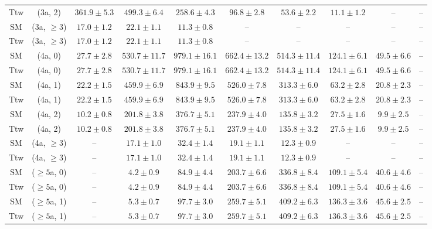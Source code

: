 \begin{table}[h!]
{\begin{tabular}{cccccccccc}
	Ttw & (3a, 2) & $361.9\pm 5.3$ & $499.3\pm 6.4$ & $258.6\pm 4.3$ & $96.8\pm 2.8$ & $53.6\pm 2.2$ & $11.1\pm 1.2$ & -- & -- \\[0.5ex] 
	SM & (3a, $\ge3$) & $17.0\pm 1.2$ & $22.1\pm 1.1$ & $11.3\pm 0.8$ & -- & -- & -- & -- & -- \\[0.5ex] 
	Ttw & (3a, $\ge3$) & $17.0\pm 1.2$ & $22.1\pm 1.1$ & $11.3\pm 0.8$ & -- & -- & -- & -- & -- \\[0.5ex] 
	SM & (4a, 0) & $27.7\pm 2.8$ & $530.7\pm 11.7$ & $979.1\pm 16.1$ & $662.4\pm 13.2$ & $514.3\pm 11.4$ & $124.1\pm 6.1$ & $49.5\pm 6.6$ & -- \\[0.5ex] 
	Ttw & (4a, 0) & $27.7\pm 2.8$ & $530.7\pm 11.7$ & $979.1\pm 16.1$ & $662.4\pm 13.2$ & $514.3\pm 11.4$ & $124.1\pm 6.1$ & $49.5\pm 6.6$ & -- \\[0.5ex] 
	SM & (4a, 1) & $22.2\pm 1.5$ & $459.9\pm 6.9$ & $843.9\pm 9.5$ & $526.0\pm 7.8$ & $313.3\pm 6.0$ & $63.2\pm 2.8$ & $20.8\pm 2.3$ & -- \\[0.5ex] 
	Ttw & (4a, 1) & $22.2\pm 1.5$ & $459.9\pm 6.9$ & $843.9\pm 9.5$ & $526.0\pm 7.8$ & $313.3\pm 6.0$ & $63.2\pm 2.8$ & $20.8\pm 2.3$ & -- \\[0.5ex] 
	SM & (4a, 2) & $10.2\pm 0.8$ & $201.8\pm 3.8$ & $376.7\pm 5.1$ & $237.9\pm 4.0$ & $135.8\pm 3.2$ & $27.5\pm 1.6$ & $9.9\pm 2.5$ & -- \\[0.5ex] 
	Ttw & (4a, 2) & $10.2\pm 0.8$ & $201.8\pm 3.8$ & $376.7\pm 5.1$ & $237.9\pm 4.0$ & $135.8\pm 3.2$ & $27.5\pm 1.6$ & $9.9\pm 2.5$ & -- \\[0.5ex] 
	SM & (4a, $\ge3$) & -- & $17.1\pm 1.0$ & $32.4\pm 1.4$ & $19.1\pm 1.1$ & $12.3\pm 0.9$ & -- & -- & -- \\[0.5ex] 
	Ttw & (4a, $\ge3$) & -- & $17.1\pm 1.0$ & $32.4\pm 1.4$ & $19.1\pm 1.1$ & $12.3\pm 0.9$ & -- & -- & -- \\[0.5ex] 
	SM & ($\ge5$a, 0) & -- & $4.2\pm 0.9$ & $84.9\pm 4.4$ & $203.7\pm 6.6$ & $336.8\pm 8.4$ & $109.1\pm 5.4$ & $40.6\pm 4.6$ & -- \\[0.5ex] 
	Ttw & ($\ge5$a, 0) & -- & $4.2\pm 0.9$ & $84.9\pm 4.4$ & $203.7\pm 6.6$ & $336.8\pm 8.4$ & $109.1\pm 5.4$ & $40.6\pm 4.6$ & -- \\[0.5ex] 
	SM & ($\ge5$a, 1) & -- & $5.3\pm 0.7$ & $97.7\pm 3.0$ & $259.7\pm 5.1$ & $409.2\pm 6.3$ & $136.3\pm 3.6$ & $45.6\pm 2.5$ & -- \\[0.5ex] 
	Ttw & ($\ge5$a, 1) & -- & $5.3\pm 0.7$ & $97.7\pm 3.0$ & $259.7\pm 5.1$ & $409.2\pm 6.3$ & $136.3\pm 3.6$ & $45.6\pm 2.5$ & -- \\[0.5ex] 

\end{tabular}}
\end{table}
